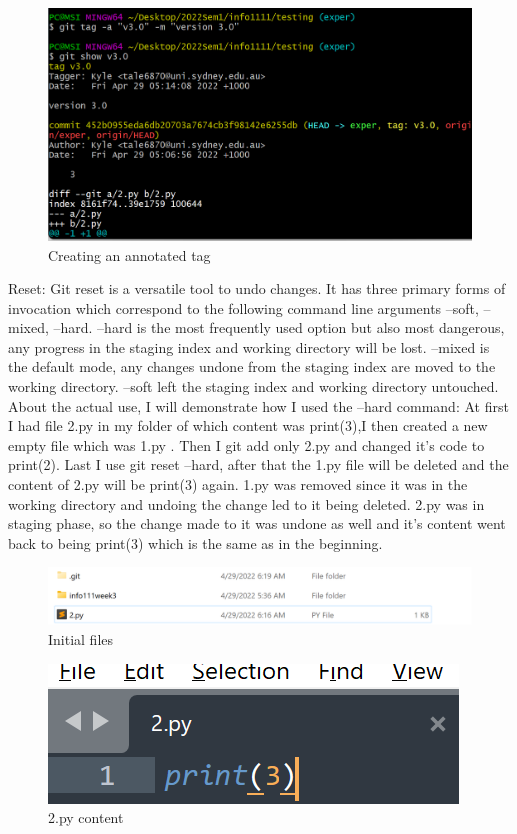 \documentclass[a4paper, 11pt]{report}
\begin{document}
\begin{figure}[!h]
\centering
\includegraphics[width=0.45\columnwidth]{Picture1.png}
\caption{Creating an annotated tag}
\label{fig}
\end{figure}

Reset: Git reset is a versatile tool to undo changes. It has three primary forms of invocation which correspond to the following command line arguments --soft, --mixed, --hard. --hard is the most frequently used option but also most dangerous, any progress in the staging index and working directory will be lost. --mixed is the default mode, any changes undone from the staging index  are moved to  the working directory. --soft left the staging index and working directory untouched.
About the actual use, I will demonstrate how I used the –hard command: At first I had file 2.py in my folder of which content was print(3),I then created a new empty file which was 1.py . Then I git add only 2.py and changed it's code to print(2). Last I use git reset –hard, after that the 1.py file will be deleted and the content of 2.py will be print(3) again.
1.py was removed since it was in the working directory and undoing the change led to it being deleted. 2.py was in staging phase, so the change made to it was undone as well and it’s content went back to being print(3) which is the same as in the beginning.

\begin{figure}[!h]
\centering
\includegraphics[width=0.45\columnwidth]{Picture2.png}
\caption{Initial files}
\label{fig}
\end{figure}

\begin{figure}[!h]
\centering
\includegraphics[width=0.45\columnwidth]{Picture3.png}
\caption{2.py content}
\label{fig}
\end{figure}
\end{document}
